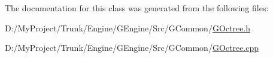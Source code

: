 The documentation for this class was generated from the following files\+:\begin{DoxyCompactItemize}
\item 
D\+:/\+My\+Project/\+Trunk/\+Engine/\+G\+Engine/\+Src/\+G\+Common/\hyperlink{_g_octree_8h}{G\+Octree.\+h}\item 
D\+:/\+My\+Project/\+Trunk/\+Engine/\+G\+Engine/\+Src/\+G\+Common/\hyperlink{_g_octree_8cpp}{G\+Octree.\+cpp}\end{DoxyCompactItemize}
